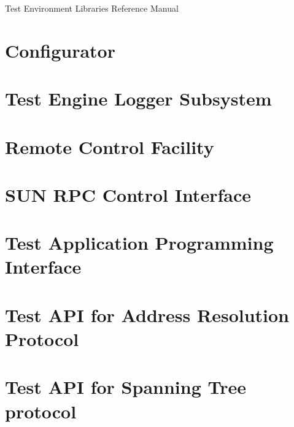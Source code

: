 \documentclass[a4paper]{book}
\begin{document}
\begin{titlepage}
\vspace*{7cm}
\begin{center}
{\Large Test Environment Libraries Reference Manual}\\
\end{center}
\end{titlepage}
\clearemptydoublepage
{}
\tableofcontents
\clearemptydoublepage
{}
\chapter{Configurator}


\chapter{Test Engine Logger Subsystem}

\chapter{Remote Control Facility}

\chapter{SUN RPC Control Interface}


\chapter{Test Application Programming Interface}


















\chapter{Test API for Address Resolution Protocol}



\chapter{Test API for Spanning Tree protocol}

\end{document}
